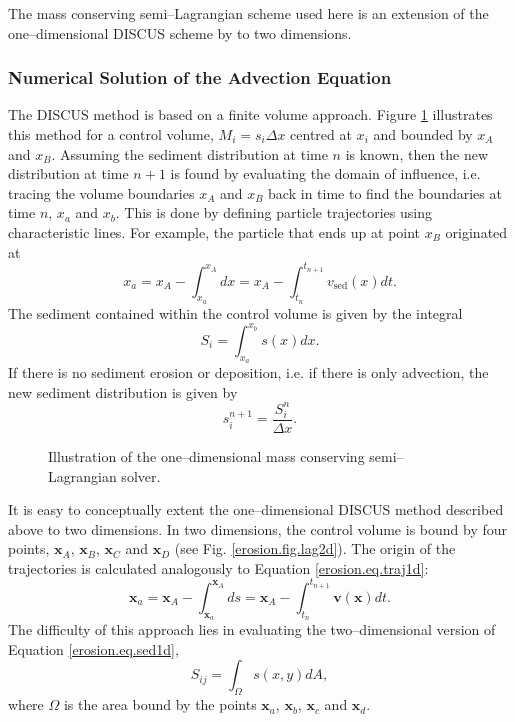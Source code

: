 The mass conserving semi--Lagrangian scheme used here is an extension of the one--dimensional DISCUS scheme by \citet{transport.3,transport.5} to two dimensions.

\subsubsection{Numerical Solution of the Advection Equation}
The DISCUS method is based on a finite volume approach. Figure \ref{erosion.fig.lag1d} illustrates this method for a control volume, $M_i=s_i\Delta x$ centred at $x_i$ and bounded by $x_A$ and $x_B$. Assuming the sediment distribution at time $n$ is known, then the new distribution at time $n+1$ is found by evaluating the domain of influence, i.e. tracing the volume boundaries $x_A$ and $x_B$ back in time to find the boundaries at time $n$, $x_a$ and $x_b$. This is done by defining particle trajectories using characteristic lines. For example, the particle that ends up at point $x_B$ originated at
\begin{equation}
  \label{erosion.eq.traj1d}
  x_a=x_A-\int^{x_A}_{x_a}dx=x_A-\int^{t_{n+1}}_{t_n}v_{\text{sed}}(x)dt.
\end{equation}
The sediment contained within the control volume is given by the integral
\begin{equation}
  \label{erosion.eq.sed1d}
  S_i=\int_{x_a}^{x_b}s(x)dx.
\end{equation}
If there is no sediment erosion or deposition, i.e. if there is only advection,
the new sediment distribution is given by
\begin{equation}
  s_i^{n+1}=\frac{S_i^n}{\Delta x}.
\end{equation}

\begin{figure}[htbp]
  \centering
  
  \caption{Illustration of the one--dimensional mass conserving semi--Lagrangian solver.}
  \label{erosion.fig.lag1d}
\end{figure}

It is easy to conceptually extent the one--dimensional DISCUS method described above to two dimensions. In two dimensions, the control volume is bound by four points, $\mathbf{x}_A$,  $\mathbf{x}_B$, $\mathbf{x}_C$ and $\mathbf{x}_D$ (see Fig. \ref{erosion.fig.lag2d}). The origin of the trajectories is calculated analogously to Equation \eqref{erosion.eq.traj1d}:
\begin{equation}
  \mathbf{x}_a=\mathbf{x}_A-\int^{\mathbf{x}_A}_{\mathbf{x}_a}ds=\mathbf{x}_A-\int^{t_{n+1}}_{t_n}\mathbf{v}(\mathbf{x})dt.
\end{equation}
The difficulty of this approach lies in evaluating the two--dimensional version of Equation \eqref{erosion.eq.sed1d},
\begin{equation}
  \label{erosion.eq.sed2d}
  S_{ij}=\int_\Omega s(x,y)dA,
\end{equation}
where $\Omega$ is the area bound by the points $\mathbf{x}_a$,  $\mathbf{x}_b$, $\mathbf{x}_c$ and $\mathbf{x}_d$.


